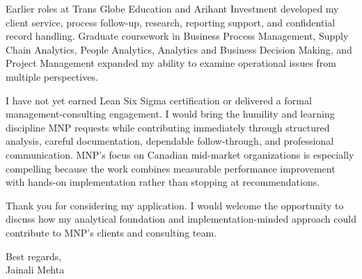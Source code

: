 \documentclass[letterpaper,11pt]{article}
\begin{document}
\bigbreak
Earlier roles at Trans Globe Education and Arihant Investment developed my client service, process follow-up, research, reporting support, and confidential record handling. Graduate coursework in Business Process Management, Supply Chain Analytics, People Analytics, Analytics and Business Decision Making, and Project Management expanded my ability to examine operational issues from multiple perspectives.

\bigbreak
I have not yet earned Lean Six Sigma certification or delivered a formal management-consulting engagement. I would bring the humility and learning discipline MNP requests while contributing immediately through structured analysis, careful documentation, dependable follow-through, and professional communication. MNP's focus on Canadian mid-market organizations is especially compelling because the work combines measurable performance improvement with hands-on implementation rather than stopping at recommendations.

\bigbreak
Thank you for considering my application. I would welcome the opportunity to discuss how my analytical foundation and implementation-minded approach could contribute to MNP's clients and consulting team.

\bigbreak
Best regards,\\
Jainali Mehta
\end{document}
